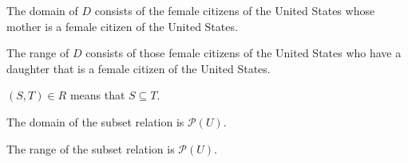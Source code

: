 \begin{list}{\bf{\ref{exer:sec71-3}.}}
\item \begin{list}{\bf{(a)}}
\item The domain of  $D$  consists of the female citizens of the United States whose mother is a female citizen of the United States.
\end{list}
\end{list}

\begin{list}{}
\item \begin{list}{\bf{(b)}}
\item The range of  $D$  consists of those female citizens of the United States who have a daughter that is a female citizen of the United States.
\end{list}
\end{list}

\begin{list}{\bf{\ref{exer:sec71-4}.}}
\item \begin{list}{\bf{(a)}}
\item $( {S, T} ) \in R$ means that $S \subseteq T$.
\end{list}
\end{list}

\begin{list}{}
\item \begin{list}{\bf{(b)}}
\item The domain of the subset relation is $\mathcal{P} ( U )$.
\end{list}
\end{list}

\begin{list}{}
\item \begin{list}{\bf{(c)}}
\item The range of the subset relation is $\mathcal{P} ( U )$.
\end{list}
\end{list}


